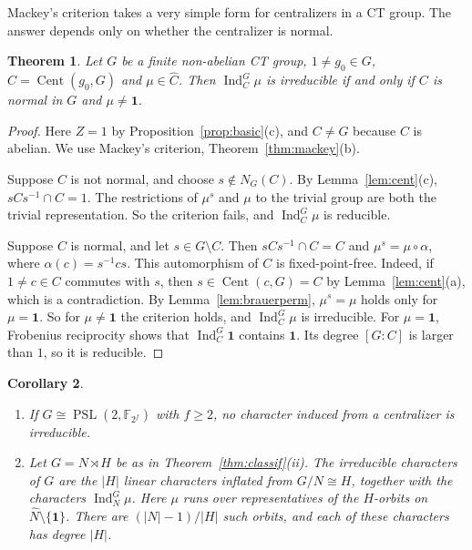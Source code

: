 \documentclass[12pt,letterpaper]{article}
\numberwithin{equation}{section}
\theoremstyle{plain}
\newtheorem{theorem}{Theorem}[section]
\newtheorem{corollary}[theorem]{Corollary}
\theoremstyle{definition}
\newcommand{\F}{\mathbb{F}}
\DeclareMathOperator{\Cent}{Cent}
\DeclareMathOperator{\Ind}{Ind}
\DeclareMathOperator{\PSL}{PSL}
\newcommand{\triv}{\mathbf{1}}
\begin{document}
Mackey's criterion takes a very simple form for centralizers in a CT group.
The answer depends only on whether the centralizer is normal.

\begin{theorem}\label{thm:irred}
Let $G$ be a finite non-abelian CT group, $1\neq g_0\in G$,
$C=\Cent(g_0,G)$ and $\mu\in\widehat C$. Then $\Ind_C^G\mu$ is irreducible
if and only if $C$ is normal in $G$ and $\mu\neq\triv$.
\end{theorem}

\begin{proof}
Here $Z=1$ by Proposition~\ref{prop:basic}(c), and $C\neq G$ because $C$ is
abelian. We use Mackey's criterion, Theorem~\ref{thm:mackey}(b).

Suppose $C$ is not normal, and choose $s\notin N_G(C)$. By
Lemma~\ref{lem:cent}(c), $sCs^{-1}\cap C=1$. The restrictions of $\mu^s$ and
$\mu$ to the trivial group are both the trivial representation. So the
criterion fails, and $\Ind_C^G\mu$ is reducible.

Suppose $C$ is normal, and let $s\in G\setminus C$. Then $sCs^{-1}\cap C=C$
and $\mu^s=\mu\circ\alpha$, where $\alpha(c)=s^{-1}cs$. This automorphism
of $C$ is fixed-point-free. Indeed, if $1\neq c\in C$ commutes with $s$,
then $s\in\Cent(c,G)=C$ by Lemma~\ref{lem:cent}(a), which is a
contradiction. By Lemma~\ref{lem:brauerperm}, $\mu^s=\mu$ holds only for
$\mu=\triv$. So for $\mu\neq\triv$ the criterion holds, and $\Ind_C^G\mu$
is irreducible. For $\mu=\triv$, Frobenius reciprocity shows that
$\Ind_C^G\triv$ contains $\triv$. Its degree $[G:C]$ is larger than $1$, so
it is reducible.
\end{proof}

\begin{corollary}\label{cor:frobchars}
\begin{enumerate}[label=(\alph*),itemsep=1pt]
\item If $G\cong\PSL(2,\F_{2^f})$ with $f\ge2$, no character induced from a
  centralizer is irreducible.
\item Let $G=N\rtimes H$ be as in Theorem~\ref{thm:classif}(ii). The
  irreducible characters of $G$ are the $|H|$ linear characters inflated
  from $G/N\cong H$, together with the characters $\Ind_N^G\mu$. Here $\mu$
  runs over representatives of the $H$-orbits on $\widehat N\setminus
  \{\triv\}$. There are $(|N|-1)/|H|$ such orbits, and each of these
  characters has degree $|H|$.
\end{enumerate}
\end{corollary}
\end{document}
